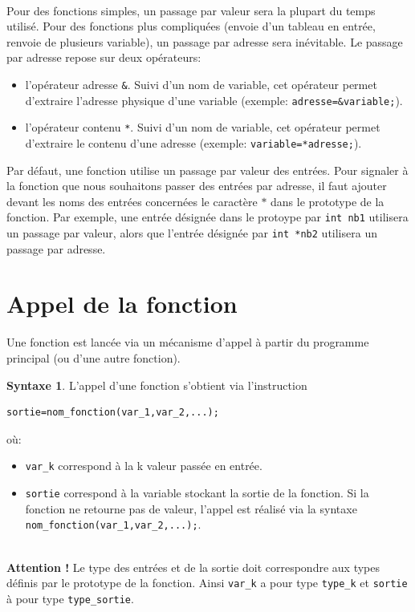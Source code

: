 \documentclass[a4paper,11pt]{book}
\newenvironment{warning} 
   {~\\ \textbf{Attention !}}{\\}
\theoremstyle{definition}
\newtheorem*{syntaxe}{Syntaxe}
\begin{document}
~\\
Pour des fonctions simples, un passage par valeur sera la plupart du temps utilisé. Pour des fonctions plus compliquées (envoie d'un tableau en entrée, renvoie de plusieurs variable), un passage par adresse sera inévitable. Le passage par adresse repose sur deux opérateurs:
\begin{itemize}
\item l'opérateur adresse \texttt{\&}. Suivi d'un nom de variable, cet opérateur permet d'extraire l'adresse physique d'une variable (exemple: \texttt{adresse=\&variable;}).
\item l'opérateur contenu \texttt{*}. Suivi d'un nom de variable, cet opérateur permet d'extraire le contenu d'une adresse (exemple: \texttt{variable=*adresse;}).\\
\end{itemize}
Par défaut, une fonction utilise un passage par valeur des entrées. Pour signaler à la fonction que nous souhaitons passer des entrées par adresse, il faut ajouter devant les noms des entrées concernées le caractère $*$ dans le prototype de la fonction. Par exemple, une entrée désignée dans le protoype par \texttt{int nb1} utilisera un passage par valeur, alors que l'entrée désignée par \texttt{int *nb2} utilisera un passage par adresse.

\section{Appel de la fonction} Une fonction est lancée via un
mécanisme d'appel à partir du programme principal (ou d'une autre fonction).
\begin{syntaxe} L'appel d'une fonction s'obtient via l'instruction
\begin{lstlisting}
sortie=nom_fonction(var_1,var_2,...);
\end{lstlisting}
où:
\begin{itemize}
\item \texttt{var\_k} correspond à la k\ieme{} valeur passée en entrée.
\item \texttt{sortie} correspond à la variable stockant la sortie de la fonction. Si la fonction ne retourne
pas de valeur, l'appel est réalisé via la syntaxe
\texttt{nom\_fonction(var\_1,var\_2,...);}.
\end{itemize}
\end{syntaxe}

\begin{warning}
Le type des entrées et de la sortie doit correspondre aux types définis par le prototype de la fonction. Ainsi \texttt{var\_k} a pour type \texttt{type\_k} et \texttt{sortie} à pour type \texttt{type\_sortie}.
\end{warning}
\end{document}
